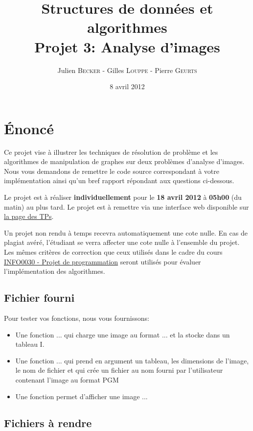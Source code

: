 \documentclass[a4paper,10pt]{article}
\title{
    \textbf{Structures de données et algorithmes}\\
    Projet 3: Analyse d'images
}
\author{Julien \textsc{Becker} - Gilles \textsc{Louppe} - Pierre \textsc{Geurts}}
\date{8 avril 2012}
\begin{document}
\maketitle

\section*{\'Enoncé}

Ce projet vise à illustrer les techniques de résolution de problème et
les algorithmes de manipulation de graphes sur deux problèmes
d'analyse d'images. Nous vous demandons de remettre le code source
correspondant à votre implémentation ainsi qu'un bref rapport
répondant aux questions ci-dessous.

Le projet est à réaliser {\bf individuellement} pour le {\bf 18 avril
  2012} à {\bf 05h00} (du matin) au plus tard. Le projet est à
remettre via une interface web disponible sur
\href{http://www.montefiore.ulg.ac.be/~glouppe/2011-2012/students.info0902.php}{la
  page des TPs}.

Un projet non rendu à temps recevra automatiquement une cote nulle. En
cas de plagiat avéré, l'étudiant se verra affecter une cote nulle à
l'ensemble du projet. Les mêmes critères de correction que ceux
utilisés dans le cadre du cours
\href{http://www.montefiore.ulg.ac.be/~info0030/}{INFO0030 - Projet de
  programmation} seront utilisés pour évaluer l'implémentation des
algorithmes.

\subsection*{Fichier fourni}

Pour tester vos fonctions, nous vous fournissons:
\begin{itemize}
\item Une fonction ... qui charge une image au format ... et la stocke dans un tableau I.
\item Une fonction ... qui prend en argument un tableau, les dimensions de l'image, le nom de fichier et qui crée un fichier au nom fourni par l'utilisateur contenant l'image au format PGM
\item Une fonction permet d'afficher une image ...
\end{itemize}

\subsection*{Fichiers à rendre}
\end{document}

